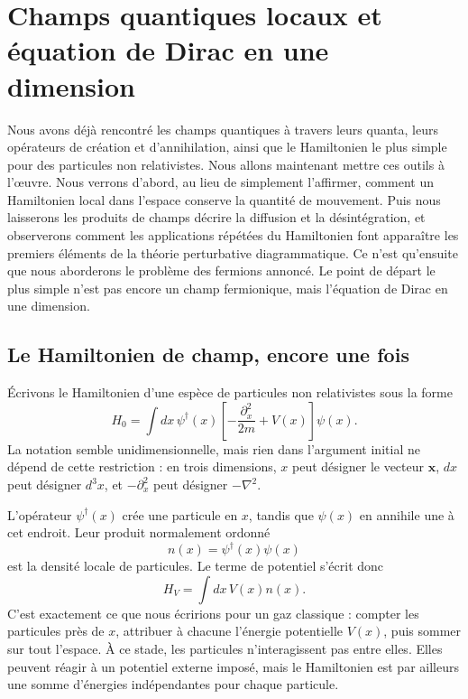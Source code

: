 \chapter{Champs quantiques locaux et équation de Dirac en une dimension}

Nous avons déjà rencontré les champs quantiques à travers leurs quanta, leurs opérateurs de création et d’annihilation, ainsi que le Hamiltonien le plus simple pour des particules non relativistes. Nous allons maintenant mettre ces outils à l’œuvre. Nous verrons d’abord, au lieu de simplement l’affirmer, comment un Hamiltonien local dans l’espace conserve la quantité de mouvement. Puis nous laisserons les produits de champs décrire la diffusion et la désintégration, et observerons comment les applications répétées du Hamiltonien font apparaître les premiers éléments de la théorie perturbative diagrammatique. Ce n’est qu’ensuite que nous aborderons le problème des fermions annoncé. Le point de départ le plus simple n’est pas encore un champ fermionique, mais l’équation de Dirac en une dimension.

\section{Le Hamiltonien de champ, encore une fois}

Écrivons le Hamiltonien d’une espèce de particules non relativistes sous la forme
\begin{equation}
H_0=\int dx\,
\psi^\dagger(x)
\left[-\frac{\partial_x^2}{2m}+V(x)\right]
\psi(x).
\label{eq:l9-nonrel-hamiltonian}
\end{equation}
La notation semble unidimensionnelle, mais rien dans l’argument initial ne dépend de cette restriction : en trois dimensions, \(x\) peut désigner le vecteur \(\mathbf{x}\), \(dx\) peut désigner \(d^3x\), et \(-\partial_x^2\) peut désigner \(-\nabla^2\).

L’opérateur \(\psi^\dagger(x)\) crée une particule en \(x\), tandis que \(\psi(x)\) en annihile une à cet endroit. Leur produit normalement ordonné
\begin{equation}
n(x)=\psi^\dagger(x)\psi(x)
\end{equation}
est la densité locale de particules. Le terme de potentiel s’écrit donc
\begin{equation}
H_V=\int dx\,V(x)n(x).
\end{equation}
C’est exactement ce que nous écririons pour un gaz classique : compter les particules près de \(x\), attribuer à chacune l’énergie potentielle \(V(x)\), puis sommer sur tout l’espace. À ce stade, les particules n’interagissent pas entre elles. Elles peuvent réagir à un potentiel externe imposé, mais le Hamiltonien est par ailleurs une somme d’énergies indépendantes pour chaque particule.

